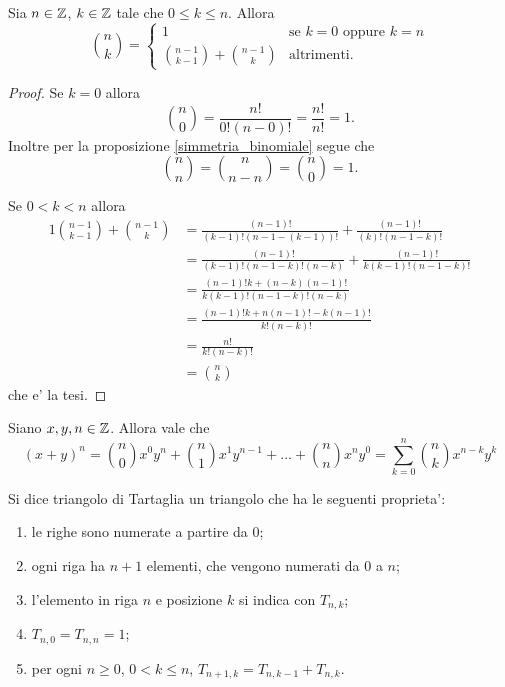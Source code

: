 \begin{proposition} \label{binomiale_ricorsivo}
    Sia $n \in \mathbb{Z}$, $k \in \mathbb{Z}$ tale che $0 \leq k \leq n$. Allora \begin{equation}
        \binom{n}{k} = \begin{cases}
            1 &\text{se } k = 0 \text{ oppure } k = n \\
            \binom{n - 1}{k - 1} + \binom{n - 1}{k} &\text{altrimenti}.
        \end{cases}
    \end{equation}
\end{proposition}
\begin{proof}
    Se $k = 0$ allora \[\binom{n}{0} = \frac{n!}{0!(n-0)!} = \frac{n!}{n!} = 1.\] 
    Inoltre per la proposizione \ref{simmetria_binomiale} segue che \[\binom{n}{n} = \binom{n}{n - n} = \binom{n}{0} = 1.\]

    Se $0 < k < n$ allora \begin{alignat*}
        {1}
        \binom{n - 1}{k - 1} + \binom{n - 1}{k} &= \frac{(n-1)!}{(k-1)!(n-1-(k-1))!} + \frac{(n-1)!}{(k)!(n-1-k)!} \\[1em]
        &= \frac{(n-1)!}{(k-1)!(n-1-k)!(n-k)} + \frac{(n-1)!}{k(k-1)!(n-1-k)!} \\[1em]
        &= \frac{(n-1)!k + (n-k)(n-1)!}{k(k-1)!(n-1-k)!(n-k)} \\[1em]
        &= \frac{(n-1)!k + n(n-1)! - k(n-1)!}{k!(n-k)!} \\
        &= \frac{n!}{k!(n-k)!} \\[1em]
        &= \binom{n}{k}
    \end{alignat*}
    che e' la tesi.
\end{proof}

\begin{theorem} \label{binomiale}
    Siano $x, y, n \in \mathbb{Z}$. Allora vale che
    \begin{equation}
        (x+y)^n = \binom{n}{0}x^0y^n + \binom{n}{1}x^1y^{n-1} + \dots + \binom{n}{n}x^ny^0 = \sum_{k=0}^n \binom{n}{k}x^{n-k}y^k
    \end{equation}
\end{theorem}

\begin{definition}
    Si dice triangolo di Tartaglia un triangolo che ha le seguenti proprieta':
    \begin{enumerate}
        \item le righe sono numerate a partire da $0$;
        \item ogni riga ha $n + 1$ elementi, che vengono numerati da $0$ a $n$;
        \item l'elemento in riga $n$ e posizione $k$ si indica con $T_{n, k}$;
        \item $T_{n, 0} = T_{n, n} = 1$;
        \item per ogni $n \geq 0$, $0 < k \leq n$, $T_{n + 1, k} = T_{n, k - 1} + T_{n, k}$.
    \end{enumerate}
\end{definition}



